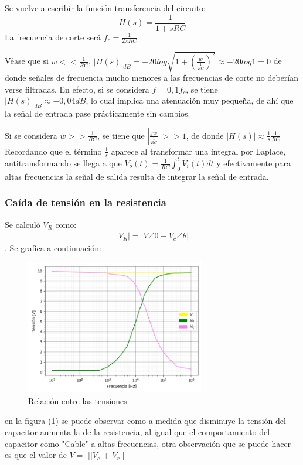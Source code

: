 \documentclass[11pt, a4paper]{article}
\begin{document}
Se vuelve a escribir la función transferencia del circuito: \begin{equation*}
    H(s)=\frac{1}{1+sRC}
\end{equation*}
La frecuencia de corte será $f_c=\frac{1}{2\pi RC}$

Véase que si $w<<\frac{1}{RC}$, $|H(s)|_{dB}=-20log\sqrt{1+(\frac{w}{\frac{1}{RC}})^2}\approx-20log1=0$ de donde señales de frecuencia mucho menores a las frecuencias de corte no deberían verse filtradas. En efecto, si se considera $f=0,1f_c$, se tiene $|H(s)|_{dB}\approx-0,04dB$, lo cual implica una atenuación muy pequeña, de ahí que la señal de entrada pase prácticamente sin cambios.

Si se considera $w>>\frac{1}{RC}$, se tiene que $|\frac{jw}{\frac{1}{RC}}|>>1$, de donde $|H(s)|\approx\frac{1}{s}\frac{1}{RC}$ Recordando que el término $\frac{1}{s}$ aparece al transformar una integral por Laplace, antitransformando se llega a que $V_o(t)=\frac{1}{RC}\int_{0}^{t}V_i(t)dt $ y efectivamente para altas frecuencias la señal de salida resulta de integrar la señal de entrada.

\subsubsection*{Caída de tensión en la resistencia}

Se calculó $V_R$  como:
\begin{align}
|V_R| = |V\angle0 - V_c\angle{\theta}|
 \end{align}
. Se grafica a continuación:

\begin{figure}[H]
	\centering
	\includegraphics[width=0.7\textwidth]{Tensiones.png}
	\caption{Relación entre las tensiones} 
	\label{graf:Tensiones}
\end{figure}
en la figura (\ref{graf:Tensiones}) se puede observar como a medida que disminuye la tensión del capacitor aumenta la de la resistencia, al igual que el comportamiento del capacitor como "Cable" a altas frecuencias,  otra observación que se puede hacer es que el valor de $V=$ $ ||V_c$ + $V_r||$ 
\end{document}
